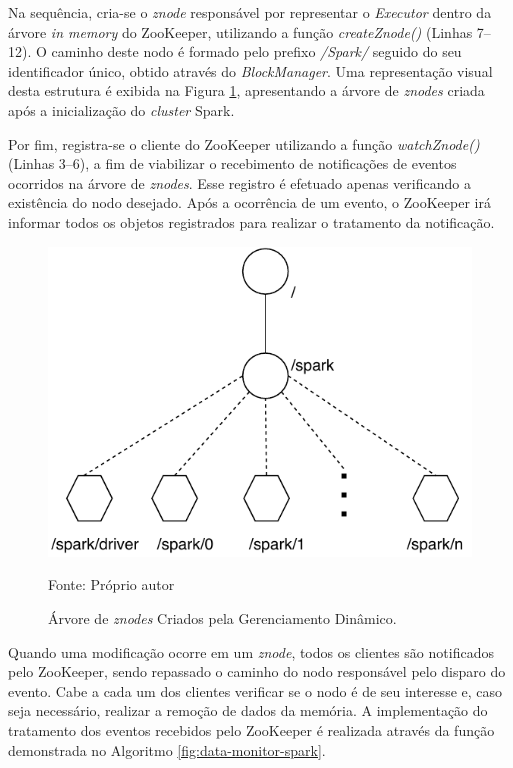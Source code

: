 Na sequência, cria-se o \textit{znode} responsável por representar o \textit{Executor} dentro da árvore \textit{in memory} do ZooKeeper, utilizando a função \textit{createZnode()} (Linhas 7--12). O caminho deste nodo é formado pelo prefixo \textit{/Spark/} seguido do seu identificador único, obtido através do \textit{BlockManager}. Uma representação visual desta estrutura é exibida na Figura \ref{fig:estrutura-utilizada-zookeeper}, apresentando a árvore de \textit{znodes} criada após a inicialização do \textit{cluster} Spark.

Por fim, registra-se o cliente do ZooKeeper utilizando a função \textit{watchZnode()}(Linhas 3--6), a fim de viabilizar o recebimento de notificações de eventos ocorridos na árvore de \textit{znodes}. Esse registro é efetuado apenas verificando a existência do nodo desejado. Após a ocorrência de um evento, o ZooKeeper irá informar todos os objetos registrados para realizar o tratamento da notificação.
 
\begin{figure}[!ht]
    \caption{Árvore de \textit{znodes} Criados pela Gerenciamento Dinâmico.}
    \begin{center}
        \includegraphics[scale=0.8]{imagens/estrutura-utilizada-zookeeper.pdf}
    \end{center}
    \small{Fonte: Próprio autor}
    \label{fig:estrutura-utilizada-zookeeper}
\end{figure}

Quando uma modificação ocorre em um \textit{znode}, todos os clientes são notificados pelo ZooKeeper, sendo repassado o caminho do nodo responsável pelo disparo do evento. Cabe a cada um dos clientes verificar se o nodo é de seu interesse e, caso seja necessário, realizar a remoção de dados da memória. A implementação do tratamento dos eventos recebidos pelo ZooKeeper é realizada através da função  demonstrada no Algoritmo \ref{fig:data-monitor-spark}. 

